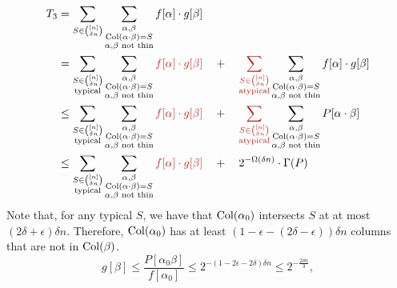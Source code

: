 \begin{align*}
  T_3 & = \sum_{S \in \binom{[n]}{\delta n}} \sum_{\substack{\alpha, \beta\\ \Col(\alpha \cdot \beta) = S \\ \text{$\alpha$,$\beta$ not thin}}} f[\alpha] \cdot g[\beta]\\
      & = \sum_{\substack{S \in \binom{[n]}{\delta n}\\\text{typical}}} \sum_{\substack{\alpha, \beta\\ \Col(\alpha \cdot \beta) = S \\ \text{$\alpha$,$\beta$ not thin}}} \textcolor{BrickRed}{f[\alpha] \cdot g[\beta]}  \quad+\quad \textcolor{BrickRed}{\sum_{\substack{S \in \binom{[n]}{\delta n}\\\text{atypical}}}} \sum_{\substack{\alpha, \beta\\ \Col(\alpha \cdot \beta) = S \\ \text{$\alpha$,$\beta$ not thin}}} f[\alpha] \cdot g[\beta]\\
      & \leq \sum_{\substack{S \in \binom{[n]}{\delta n}\\\text{typical}}} \sum_{\substack{\alpha, \beta\\ \Col(\alpha \cdot \beta) = S \\ \text{$\alpha$,$\beta$ not thin}}} \textcolor{BrickRed}{f[\alpha] \cdot g[\beta]}  \quad+\quad \textcolor{BrickRed}{\sum_{\substack{S \in \binom{[n]}{\delta n}\\\text{atypical}}}} \sum_{\substack{\alpha, \beta\\ \Col(\alpha \cdot \beta) = S \\ \text{$\alpha$,$\beta$ not thin}}} P[\alpha \cdot \beta]\\
  & \leq \sum_{\substack{S \in \binom{[n]}{\delta n}\\\text{typical}}} \sum_{\substack{\alpha, \beta\\ \Col(\alpha \cdot \beta) = S \\ \text{$\alpha$,$\beta$ not thin}}} \textcolor{BrickRed}{f[\alpha] \cdot g[\beta]}  \quad+\quad 2^{-\Omega(\delta n)} \cdot \Gamma(P)
\end{align*}
Note that, for any typical $S$, we have that $\operatorname{Col}(\alpha_0)$ intersects $S$ at at most $(2\delta + \epsilon)\delta n$. Therefore, $\operatorname{Col}(\alpha_0)$ has at least $(1 - \epsilon - (2\delta - \epsilon))\delta n$ columns that are not in $\operatorname{Col}(\beta)$. 
\[
  g[\beta] \leq \frac{P[\alpha_0 \beta]}{f[\alpha_0]} \leq 2^{-(1 - 2\epsilon - 2\delta)\delta n} \leq 2^{-\frac{2\delta n}{3}},
\]
